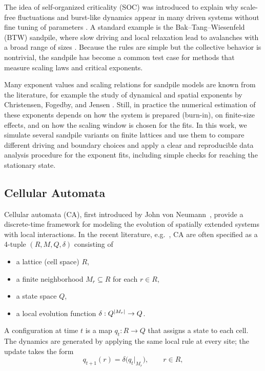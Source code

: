 The idea of self-organized criticality (SOC) was introduced to explain why
scale-free fluctuations and burst-like dynamics appear in many driven systems
without fine tuning of parameters \cite{bak1987self}. A standard example is the
Bak--Tang--Wiesenfeld (BTW) sandpile, where slow driving and local relaxation lead
to avalanches with a broad range of sizes \cite{Dhar1990}. Because the rules are
simple but the collective behavior is nontrivial, the sandpile has become a
common test case for methods that measure scaling laws and critical exponents.

Many exponent values and scaling relations for sandpile models are known from the
literature, for example the study of dynamical and spatial exponents by
Christensen, Fogedby, and Jensen \cite{christensen1991dynamical}. Still, in
practice the numerical estimation of these exponents depends on how the system is
prepared (burn-in), on finite-size effects, and on how the scaling window is
chosen for the fits. In this work, we simulate several sandpile variants on
finite lattices and use them to compare different driving and boundary
choices and apply a clear and reproducible data analysis procedure for the
exponent fits, including simple checks for reaching the stationary state.


\subsection{Cellular Automata}

Cellular automata (CA), first introduced by John von Neumann~\cite{vonNeumann1966SelfReproducing}, provide a discrete-time framework for modeling the evolution of spatially extended systems with local interactions. In the recent literature, e.g.\ \cite{PerezDelgadoCheung2007}, CA are often specified as a 4-tuple $(R,M,Q,\delta)$ consisting of
\begin{itemize}
    \item a lattice (cell space) $R$,
    \item a finite neighborhood $M_r \subseteq R$ for each $r\in R$,
    \item a state space $Q$,
    \item a local evolution function $\delta : Q^{\abs{M_r}} \to Q$.
\end{itemize}
A configuration at time $t$ is a map $q_t : R \to Q$ that assigns a state to each cell. The dynamics are generated by applying the same local rule at every site; the update takes the form
\begin{equation}
    q_{t+1}(r) = \delta\bigl(q_t|_{M_r}\bigr), \qquad r \in R,
\end{equation}

